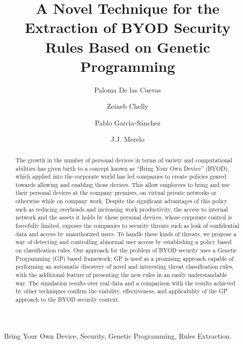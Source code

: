 \documentclass[a4paper,10pt,twocolumn,preprint,3p]{elsarticle}
\begin{document}
\begin{frontmatter}

\title{A Novel Technique for the Extraction of BYOD Security Rules Based on Genetic Programming}

\author[ugr]{Paloma De las Cuevas}
\author[isgt]{Zeineb Chelly}
\author[ugr]{Pablo Garc\'{\i}a-S\'anchez}
\author[ugr]{J.J. Merelo}

\address[ugr]{Department of Computer Architecture and Computer Technology, ETSIIT and CITIC \\
University of Granada, Granada, Spain. Tel: +34958241778. Fax: +34958248993}
\address[isgt]{LARODEC, Institut Sup\'erieur de Gestion de Tunis, Tunisia.}


\begin{abstract}
The growth in the number of personal devices in terms of variety and computational
abilities has given birth to a concept known as ``Bring Your Own Device'' (BYOD), which applied into the corporate world has led companies to create policies geared towards allowing and enabling those devices.
This allow 
employees to bring and use their personal devices at
the company premises, on virtual private networks or otherwise while
on company work. Despite the significant advantages of this policy
such as reducing overheads and increasing work productivity, the
access to internal network and the assets it holds by these personal
devices, whose corporate control is forcefully limited, exposes the companies to
security threats such as leak of confidential data and access by
unauthorized users. %
To handle these kinds of threats, we propose a way of detecting and controlling abnormal user
access by establishing a policy based on classification rules. Our approach for the problem of BYOD security uses a Genetic Programming (GP) based framework; GP is used as a promising approach
capable of performing an automatic discovery of novel and interesting
threat classification rules, with the additional feature of presenting the new rules in an easily understandable way.
The simulation results over real data and a
comparison with the results achieved by other techniques confirm the
viability, effectiveness, and applicability of the GP approach to the
BYOD security context.
\end{abstract}


\begin{keyword}
Bring Your Own Device, Security, Genetic Programming, Rules Extraction. 
\end{keyword}

\end{frontmatter}
\end{document}

